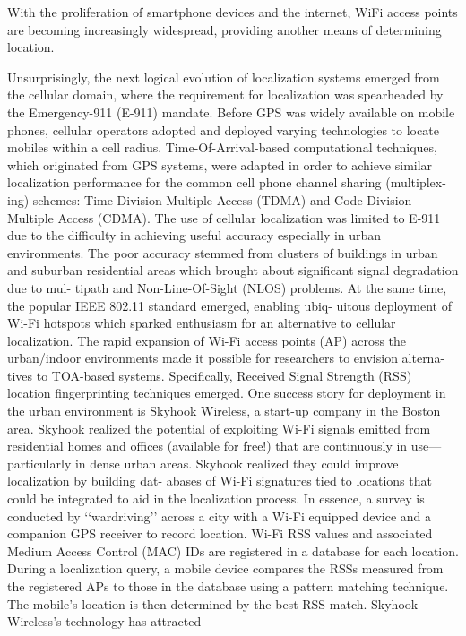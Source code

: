 With the proliferation of smartphone devices and the internet,
WiFi access points are becoming increasingly widespread, 
providing another means of determining location.


Unsurprisingly, the next logical evolution of localization systems emerged from
the cellular domain, where the requirement for localization was spearheaded by the
Emergency-911 (E-911) mandate. Before GPS was widely available on mobile
phones, cellular operators adopted and deployed varying technologies to locate
mobiles within a cell radius. Time-Of-Arrival-based computational techniques,
which originated from GPS systems, were adapted in order to achieve similar
localization performance for the common cell phone channel sharing (multiplex-
ing) schemes: Time Division Multiple Access (TDMA) and Code Division
Multiple Access (CDMA). The use of cellular localization was limited to E-911
due to the difficulty in achieving useful accuracy especially in urban environments.
The poor accuracy stemmed from clusters of buildings in urban and suburban
residential areas which brought about significant signal degradation due to mul-
tipath and Non-Line-Of-Sight (NLOS) problems.
At the same time, the popular IEEE 802.11 standard emerged, enabling ubiq-
uitous deployment of Wi-Fi hotspots which sparked enthusiasm for an alternative
to cellular localization. The rapid expansion of Wi-Fi access points (AP) across the
urban/indoor environments made it possible for researchers to envision alterna-
tives to TOA-based systems. Specifically, Received Signal Strength (RSS) location
fingerprinting techniques emerged. One success story for deployment in the urban
environment is Skyhook Wireless, a start-up company in the Boston area. Skyhook
realized the potential of exploiting Wi-Fi signals emitted from residential homes
and offices (available for free!) that are continuously in use—particularly in dense
urban areas. Skyhook realized they could improve localization by building dat-
abases of Wi-Fi signatures tied to locations that could be integrated to aid in the
localization process. In essence, a survey is conducted by ‘‘wardriving’’ across a
city with a Wi-Fi equipped device and a companion GPS receiver to record
location. Wi-Fi RSS values and associated Medium Access Control (MAC) IDs
are registered in a database for each location. During a localization query, a mobile
device compares the RSSs measured from the registered APs to those in the
database using a pattern matching technique. The mobile’s location is then
determined by the best RSS match. Skyhook Wireless’s technology has attracted
